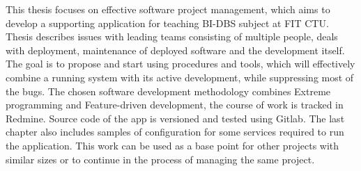 This thesis focuses on effective software project management, which aims to develop a supporting application for teaching BI-DBS subject at FIT CTU. Thesis describes issues with leading teams consisting of multiple people, deals with deployment, maintenance of deployed software and the development itself. The goal is to propose and start using procedures and tools, which will effectively combine a running system with its active development, while suppressing most of the bugs. The chosen software development methodology combines Extreme programming and Feature-driven development, the course of work is tracked in Redmine. Source code of the app is versioned and tested using Gitlab. The last chapter also includes samples of configuration for some services required to run the application. This work can be used as a base point for other projects with similar sizes or to continue in the process of managing the same project.